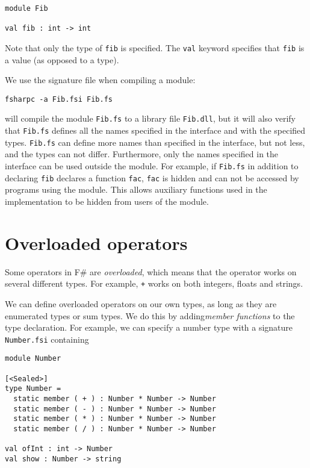 \documentclass[a4paper]{article}
\begin{document}
\renewcommand{\baselinestretch}{0.9}
\begin{verbatim}
module Fib

val fib : int -> int
\end{verbatim}
\renewcommand{\baselinestretch}{1}

\noindent
Note that only the type of \texttt{fib} is specified.  The
\texttt{val} keyword specifies that \texttt{fib} is a value (as
opposed to a type).

We use the signature file when compiling a module:

\renewcommand{\baselinestretch}{0.9}
\begin{verbatim}
fsharpc -a Fib.fsi Fib.fs
\end{verbatim}
\renewcommand{\baselinestretch}{1}

\noindent
will compile the module \texttt{Fib.fs} to a library file
\texttt{Fib.dll}, but it will also verify that \texttt{Fib.fs} defines
all the names specified in the interface and with the specified
types.  \texttt{Fib.fs} can define more names than specified in the
interface, but not less, and the types can not differ.  Furthermore,
only the names specified in the interface can be used outside the
module.  For example, if \texttt{Fib.fs} in addition to declaring
\texttt{fib} declares a function \texttt{fac}, \texttt{fac} is hidden
and can not be accessed by programs using the module.  This allows
auxiliary functions used in the implementation to be hidden from users
of the module.

\section{Overloaded operators}

Some operators in F\# are \emph{overloaded}, which means that the
operator works on several different types.  For example, \texttt{+}
works on both integers, floats and strings.

We can define overloaded operators on our own types, as long as they
are enumerated types or sum types.  We do this by adding\emph{member
  functions} to the type declaration.  For example, we can specify a
number type with a signature \texttt{Number.fsi} containing

\renewcommand{\baselinestretch}{0.9}
\begin{verbatim}
module Number

[<Sealed>]
type Number =
  static member ( + ) : Number * Number -> Number
  static member ( - ) : Number * Number -> Number
  static member ( * ) : Number * Number -> Number
  static member ( / ) : Number * Number -> Number

val ofInt : int -> Number
val show : Number -> string
\end{verbatim}
\renewcommand{\baselinestretch}{1}
\end{document}
